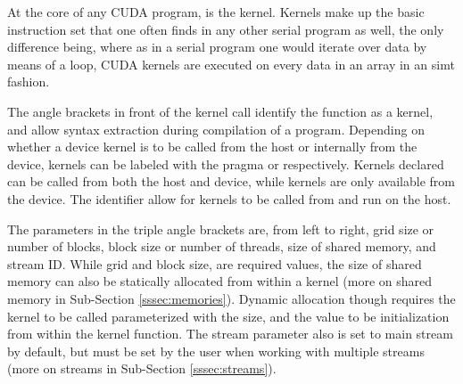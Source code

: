 At the core of any CUDA program, is the kernel. Kernels make up the basic instruction
set that one often finds in any other serial program as well, the only difference being,
where as in a serial program one would iterate over data by means of a loop,
CUDA kernels are executed on every data in an array in an \gls{simt} fashion.


The angle brackets in front of the kernel call identify the function as a kernel,
and allow syntax extraction during compilation of a program.  Depending on
whether a device kernel is to be called from the host or internally from the device,
kernels can be labeled with the pragma  or   respectively.
Kernels declared  can be called from both the host and device, while 
kernels are only available from the device.
The identifier  allow for kernels to be called from and run on the host.

The parameters in the triple angle brackets are, from left to right, grid size or number of blocks,
block size or number of threads, size of shared memory, and stream ID.  While grid and block size,
are required values, the size of shared memory can also be statically allocated from within
a kernel (more on shared memory in Sub-Section \ref{sssec:memories}).
  Dynamic allocation though requires the kernel to be called parameterized with
the size, and the value to be initialization from within the kernel function.  The stream
parameter also is set to main stream by default, but must be set by the user when
working with multiple streams (more on streams in Sub-Section \ref{sssec:streams}).
